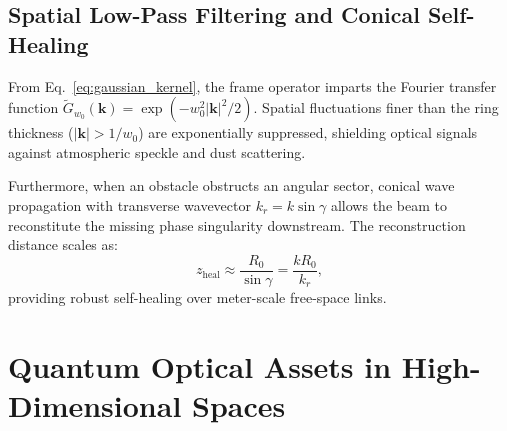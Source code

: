 \documentclass[11pt,a4paper]{article}
\begin{document}
\subsection{Spatial Low-Pass Filtering and Conical Self-Healing}

From Eq.~\eqref{eq:gaussian_kernel}, the frame operator imparts the Fourier transfer function $\widetilde{G}_{w_0}(\mathbf{k}) = \exp(-w_0^2 |\mathbf{k}|^2 / 2)$. Spatial fluctuations finer than the ring thickness ($|\mathbf{k}| > 1/w_0$) are exponentially suppressed, shielding optical signals against atmospheric speckle and dust scattering.

Furthermore, when an obstacle obstructs an angular sector, conical wave propagation with transverse wavevector $k_r = k \sin \gamma$ allows the beam to reconstitute the missing phase singularity downstream. The reconstruction distance scales as:
\begin{equation}
z_{\text{heal}} \approx \frac{R_0}{\sin \gamma} = \frac{k R_0}{k_r},
\label{eq:self_healing_distance}
\end{equation}
providing robust self-healing over meter-scale free-space links.

\section{Quantum Optical Assets in High-Dimensional Spaces}
\label{sec:quantum_assets}

\noindent{}
\vspace{0.8em}
\end{document}

